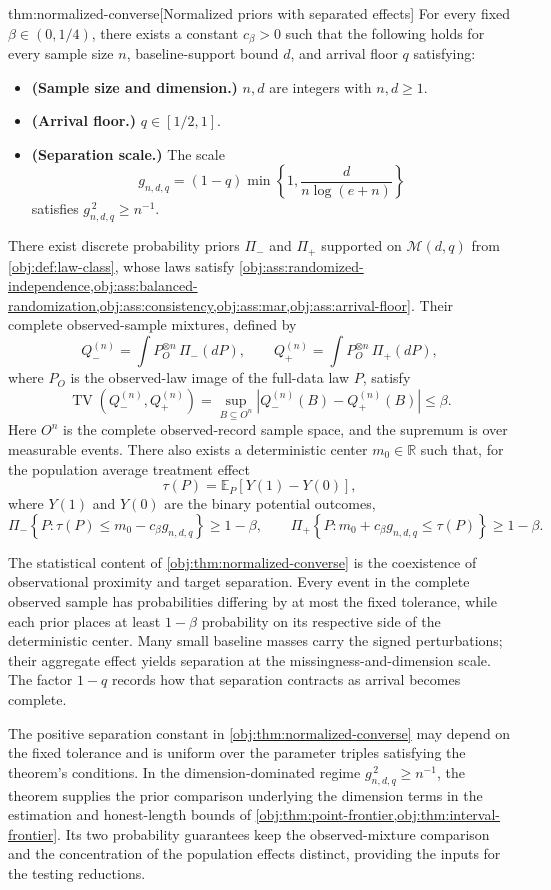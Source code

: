 \begin{theoremv}{thm:normalized-converse}[Normalized priors with separated effects]
For every fixed \(\beta\in(0,1/4)\), there exists a constant \(c_\beta>0\) such that the following holds for every sample size \(n\), baseline-support bound \(d\), and arrival floor \(q\) satisfying:
\begin{itemize}
\item \textbf{(Sample size and dimension.)} \(n,d\) are integers with \(n,d\ge1\).
\item \textbf{(Arrival floor.)} \(q\in[1/2,1]\).
\item \textbf{(Separation scale.)} The scale
\[
g_{n,d,q}=(1-q)\min\left\{1,\frac{d}{n\log(e+n)}\right\}
\]
satisfies \(g_{n,d,q}^{\,2}\ge n^{-1}\).
\end{itemize}
There exist discrete probability priors \(\Pi_-\) and \(\Pi_+\) supported on \(\mathcal M(d,q)\) from \cref{obj:def:law-class}, whose laws satisfy \cref{obj:ass:randomized-independence,obj:ass:balanced-randomization,obj:ass:consistency,obj:ass:mar,obj:ass:arrival-floor}. Their complete observed-sample mixtures, defined by
\[
Q_-^{(n)}=\int P_O^{\otimes n}\,\Pi_-(dP),
\qquad
Q_+^{(n)}=\int P_O^{\otimes n}\,\Pi_+(dP),
\]
where \(P_O\) is the observed-law image of the full-data law \(P\), satisfy
\[
\operatorname{TV}\!\left(Q_-^{(n)},Q_+^{(n)}\right)
=\sup_{B\subseteq O^n}
\left|Q_-^{(n)}(B)-Q_+^{(n)}(B)\right|
\le\beta.
\]
Here \(O^n\) is the complete observed-record sample space, and the supremum is over measurable events. There also exists a deterministic center \(m_0\in\mathbb R\) such that, for the population average treatment effect
\[
\tau(P)=\mathbb E_P\!\left[Y(1)-Y(0)\right],
\]
where \(Y(1)\) and \(Y(0)\) are the binary potential outcomes,
\[
\Pi_-\!\left\{P:\tau(P)\le m_0-c_\beta g_{n,d,q}\right\}\ge1-\beta,
\qquad
\Pi_+\!\left\{P:m_0+c_\beta g_{n,d,q}\le\tau(P)\right\}\ge1-\beta.
\]
\end{theoremv}

The statistical content of \cref{obj:thm:normalized-converse} is the coexistence of observational proximity and target separation. Every event in the complete observed sample has probabilities differing by at most the fixed tolerance, while each prior places at least \(1-\beta\) probability on its respective side of the deterministic center. Many small baseline masses carry the signed perturbations; their aggregate effect yields separation at the missingness-and-dimension scale. The factor \(1-q\) records how that separation contracts as arrival becomes complete.

The positive separation constant  in \cref{obj:thm:normalized-converse} may depend on the fixed tolerance and is uniform over the parameter triples satisfying the theorem's conditions. In the dimension-dominated regime \(g_{n,d,q}^{\,2}\ge n^{-1}\), the theorem supplies the prior comparison underlying the dimension terms in the estimation and honest-length bounds of \cref{obj:thm:point-frontier,obj:thm:interval-frontier}. Its two probability guarantees keep the observed-mixture comparison and the concentration of the population effects distinct, providing the inputs for the testing reductions.
